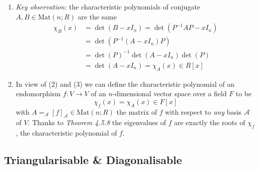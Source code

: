 \documentclass[8pt,landscape]{article}
\begin{document}
\begin{multicols}{3}
\begin{enumerate}
        \item \emph{Key observation:} the characteristic polynomials of conjugate
            $A, B \in \mathrm{Mat} (n; R)$ are the same
            \begin{align*}{}
                \chi_B (x) &= \det(B-xI_n) = \det(P^{-1} AP - xI_n) \\
                           &= \det(P^{-1} (A - xI_n)P) \\
                           &= \det{(P)}^{-1} \det(A-xI_n) \det(P) \\
                           &= \det(A-xI_n) = \chi_A(x) \in R[x]
            \end{align*}

        \item In view of (2) and (3) we can define the characteristic polynomial of an
            endomorphism $f : V \to V$ of an $n$-dimensional vector space over a field
            $F$ to be
            \[
                \chi_f(x) = \chi_A(x) \in F[x]
            \]
            with $A = _\mathcal{A} {[f]}_\mathcal{A} \in \mathrm{Mat}(n; R)$ the matrix of
            $f$ with respect to \emph{any} basis $\mathcal{A}$ of $V$.
            Thanks to \emph{Theorem 4.5.8} the eigenvalues of $f$ are exactly the roots of
            $\chi_f$, the characteristic polynomial of $f$.

    \end{enumerate}


    \subsection{Triangularisable \& Diagonalisable}


\end{multicols}
\end{document}
